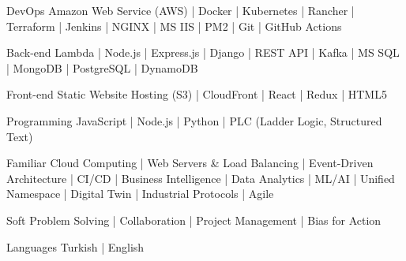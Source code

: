 

\begin{cvskills}

  \cvskill
    {DevOps} %
    {Amazon Web Service (AWS) | Docker | Kubernetes | Rancher | Terraform | Jenkins | NGINX | MS IIS | PM2 | Git | GitHub Actions } %

  \cvskill
    {Back-end} %
    {Lambda | Node.js | Express.js | Django | REST API | Kafka | MS SQL | MongoDB | PostgreSQL | DynamoDB } %

  \cvskill
    {Front-end} %
    {Static Website Hosting (S3) | CloudFront | React | Redux | HTML5} %

  \cvskill
    {Programming} %
    {JavaScript | Node.js | Python | PLC (Ladder Logic, Structured Text)} %

  \cvskill
    {Familiar} %
    {Cloud Computing | Web Servers \& Load Balancing | Event-Driven Architecture | CI/CD | Business Intelligence | Data Analytics | ML/AI |  Unified Namespace | Digital Twin | Industrial Protocols | Agile} %

  \cvskill
    {Soft} %
    {Problem Solving | Collaboration | Project Management | Bias for Action} %
    
  \cvskill
    {Languages} %
    {Turkish | English} %

\end{cvskills}